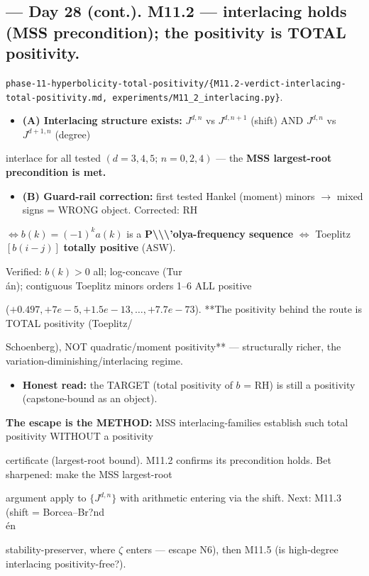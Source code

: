\documentclass[10pt]{article}
\begin{document}
\subsection*{ --- Day 28 (cont.). M11.2 --- interlacing holds (MSS precondition); the positivity is TOTAL positivity.}
\texttt{phase-11-hyperbolicity-total-positivity/\{M11.2-verdict-interlacing-total-positivity.md, experiments/M11\_2\_interlacing.py\}}.\par
\begin{itemize}
\item \textbf{(A) Interlacing structure exists:} $J^{d,n}$ vs $J^{d,n+1}$ (shift) AND $J^{d,n}$ vs $J^{d+1,n}$ (degree)
\end{itemize}
  interlace for all tested $(d{=}3,4,5;\,n{=}0,2,4)$ --- the \textbf{MSS largest-root precondition is met.}\par
\begin{itemize}
\item \textbf{(B) Guard-rail correction:} first tested Hankel (moment) minors \ensuremath{\to} mixed signs = WRONG object. Corrected: RH
\end{itemize}
  $\iff b(k){=}(-1)^k a(k)$ is a \textbf{P\textbackslash{}\textbackslash{}\textbackslash{}'olya-frequency sequence} $\iff$ Toeplitz $[b(i-j)]$ \textbf{totally positive} (ASW).\par
  Verified: $b(k)>0$ all; log-concave (Tur\\\'an); contiguous Toeplitz minors orders 1--6 ALL positive\par
  ($+0.497,+7e{-}5,+1.5e{-}13,\dots,+7.7e{-}73$). **The positivity behind the route is TOTAL positivity (Toeplitz/\par
  Schoenberg), NOT quadratic/moment positivity** --- structurally richer, the variation-diminishing/interlacing regime.\par
\begin{itemize}
\item \textbf{Honest read:} the TARGET (total positivity of $b$ = RH) is still a positivity (capstone-bound as an object).
\end{itemize}
  \textbf{The escape is the METHOD:} MSS interlacing-families establish such total positivity WITHOUT a positivity\par
  certificate (largest-root bound). M11.2 confirms its precondition holds. Bet sharpened: make the MSS largest-root\par
  argument apply to $\{J^{d,n}\}$ with arithmetic entering via the shift. Next: M11.3 (shift = Borcea--Br?nd\\\'en\par
  stability-preserver, where \ensuremath{\zeta} enters --- escape N6), then M11.5 (is high-degree interlacing positivity-free?).\par
\end{document}
